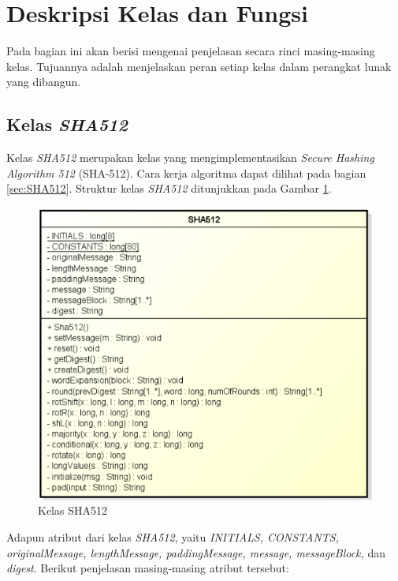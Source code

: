 \section{Deskripsi Kelas dan Fungsi}

Pada bagian ini akan berisi mengenai penjelasan secara rinci masing-masing kelas. Tujuannya adalah menjelaskan peran setiap kelas dalam perangkat lunak yang dibangun.

\subsection{Kelas \textit{SHA512}}

Kelas \textit{SHA512} merupakan kelas yang mengimplementasikan \textit{Secure Hashing Algorithm 512} (SHA-512). Cara kerja algoritma dapat dilihat pada bagian \ref{sec:SHA512}. Struktur kelas \textit{SHA512} ditunjukkan pada Gambar \ref{fig:classsha512}.

\begin{figure}[H]
	\centering
	\includegraphics[scale=0.5]{Gambar/class_sha512}
	\caption{Kelas SHA512}\label{fig:classsha512}
\end{figure}

Adapun atribut dari kelas \textit{SHA512}, yaitu \textit{INITIALS, CONSTANTS, originalMessage, lengthMessage, paddingMessage, message, messageBlock,} dan \textit{digest}. Berikut penjelasan masing-masing atribut tersebut:

